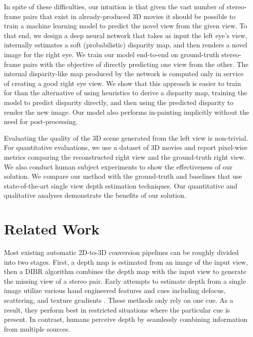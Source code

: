 \documentclass[runningheads]{llncs}
\begin{document}
In spite of these difficulties, our intuition is that given the vast number of stereo-frame pairs that exist in already-produced 3D movies it should be possible to train a machine learning model to predict the novel view from the given view.
To that end, we design a deep neural network that takes as input the left eye's view, internally estimates a soft (probabilistic) disparity map, and then renders a novel image for the right eye.
We train our model end-to-end on ground-truth stereo-frame pairs with the objective of directly predicting one view from the other.
The internal disparity-like map produced by the network is computed only in service of creating a good right eye view.
We show that this approach is easier to train for than the alternative of using heuristics to derive a disparity map, training the model to predict disparity directly, and then using the predicted disparity to render the new image.
Our model also performs in-painting implicitly without the need for post-processing.

Evaluating the quality of the 3D scene generated from the left view is non-trivial.
For quantitative evaluations, we use a dataset of 3D movies and report pixel-wise metrics comparing the reconstructed right view and the ground-truth right view.
We also conduct human subject experiments to show the effectiveness of our solution.
We compare our method with the ground-truth and baselines that use state-of-the-art single view depth estimation techniques.
Our quantitative and qualitative analyses demonstrate the benefits of our solution.

\section{Related Work}
Most existing automatic 2D-to-3D conversion pipelines can be roughly divided into two stages.
First, a depth map is estimated from an image of the input view, then a DIBR algorithm combines the depth map with the input view to generate the missing view of a stereo pair.
Early attempts to estimate depth from a single image utilize various hand engineered features and cues including defocus, scattering, and texture gradients \cite{zhuo2009recovery,cozman1997depth}.
These methods only rely on one cue.
As a result, they perform best in restricted situations where the particular cue is present.
In contrast, humans perceive depth by seamlessly combining information from multiple sources.
\end{document}

